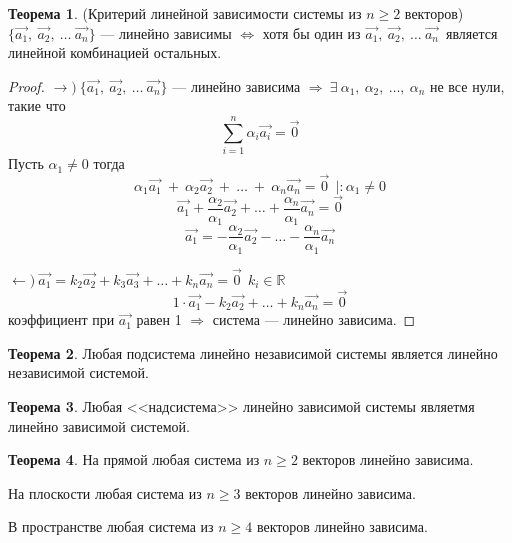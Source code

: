 \documentclass{article}
\theoremstyle{definition}
\newtheorem{theorem}{Теорема}[section]
\begin{document}
\begin{theorem}{(Критерий линейной зависимости системы из $n\geqslant 2$ векторов)}
\newline
$\{ \overrightarrow{a_1},\ \overrightarrow{a_2},\ \dots\ \overrightarrow{a_n}\} \textrm{ --- линейно зависимы } \Longleftrightarrow \textrm{ хотя бы один из }  \overrightarrow{a_1},\ \overrightarrow{a_2},\ \dots\ \overrightarrow{a_n}$\  является линейной комбинацией остальных.
\begin{proof}

$\longrightarrow )\ \{ \overrightarrow{a_1},\ \overrightarrow{a_2},\ \dots\ \overrightarrow{a_n} \} $ --- линейно зависима $\Longrightarrow\ \exists\ \alpha_1,\ \alpha_2,\ \dots ,\ \alpha_n $ не все нули, такие что 
$$\sum_{i=1}^{n}\alpha_i \overrightarrow{a_i} = \overrightarrow{0}$$
Пусть $\alpha_1\neq 0$ тогда
$$\alpha_1 \overrightarrow{a_1}\ +\ \alpha_2 \overrightarrow{a_2}\ +\ \dots\ +\ \alpha_n \overrightarrow{a_n} = \overrightarrow{0}\ \ | :\alpha_1\neq 0$$
$$ \overrightarrow{a_1} + \dfrac{\alpha_2}{\alpha_1}\overrightarrow{a_2} + \dots + \dfrac{\alpha_n}{\alpha_1}\overrightarrow{a_n} = \overrightarrow{0}$$
$$\overrightarrow{a_1} = -\dfrac{\alpha_2}{\alpha_1}\overrightarrow{a_2} - \dots - \dfrac{\alpha_n}{\alpha_1}\overrightarrow{a_n}    $$

$\longleftarrow )\ \overrightarrow{a_1} = k_2\overrightarrow{a_2} + k_3\overrightarrow{a_3} + \dots + k_n\overrightarrow{a_n} = \overrightarrow{0}\ \ k_i\in\mathbb{R}$
$$ 1\cdot\overrightarrow{a_1} - k_2\overrightarrow{a_2} + \dots + k_n\overrightarrow{a_n} = \overrightarrow{0}$$
коэффициент при $\overrightarrow{a_1}$ равен 1 $\Longrightarrow$ система --- линейно зависима.
\end{proof}
\end{theorem}

\begin{theorem}
Любая подсистема линейно независимой системы является линейно независимой системой.
\end{theorem}

\begin{theorem}
Любая <<надсистема>> линейно зависимой системы являетмя линейно зависимой системой.
\end{theorem}

\begin{theorem}

На прямой любая система из $n\geqslant 2$ векторов линейно зависима.

На плоскости любая система из $n\geqslant 3$ векторов линейно зависима.

В пространстве любая система из $n\geqslant 4$ векторов линейно зависима.
\end{theorem}
\end{document}
